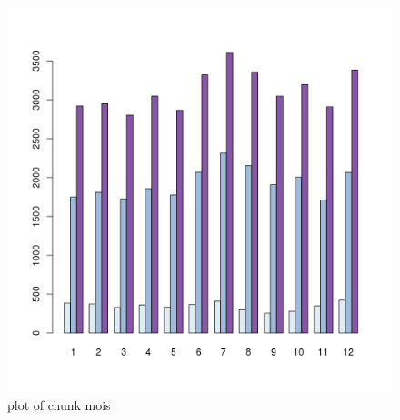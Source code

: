 \begin{Shaded}
\begin{Highlighting}[]

  \NormalTok{(}\NormalTok{, }\NormalTok{))}
\end{Highlighting}
\end{Shaded}

\begin{figure}[htbp]
\centering
\includegraphics{figure/mois6.png}
\caption{plot of chunk mois}
\end{figure}

\begin{Shaded}
\begin{Highlighting}[]

  \NormalTok{(}\NormalTok{, }\NormalTok{))}
\end{Highlighting}
\end{Shaded}

